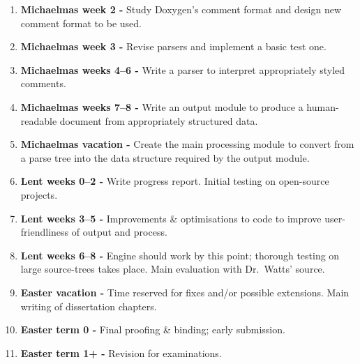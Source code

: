 \begin{enumerate}

\item {\bf Michaelmas week 2 -} Study Doxygen's comment format and
  design new comment format to be used.

\item {\bf Michaelmas week 3 -} Revise parsers and implement a basic
  test one.

\item {\bf Michaelmas weeks 4--6 -} Write a parser to interpret
  appropriately styled comments.

\item {\bf Michaelmas weeks 7--8 -} Write an output module to produce a
  human-readable document from appropriately structured data.

\item {\bf Michaelmas vacation -} Create the main processing module to
  convert from a parse tree into the data structure required by the
  output module.

\item {\bf Lent weeks 0--2 -} Write progress report. Initial testing on
  open-source projects.

\item {\bf Lent weeks 3--5 -} Improvements \& optimisations to code to
  improve user-friendliness of output and process.

\item {\bf Lent weeks 6--8 -} Engine should work by this point; thorough
  testing on large source-trees takes place. Main evaluation with Dr.~Watts' source.

\item {\bf Easter vacation -} Time reserved for fixes and/or possible
  extensions. Main writing of dissertation chapters.

\item {\bf Easter term 0 -} Final proofing \& binding; early submission.

\item {\bf Easter term 1+ -} Revision for examinations.

\end{enumerate}




